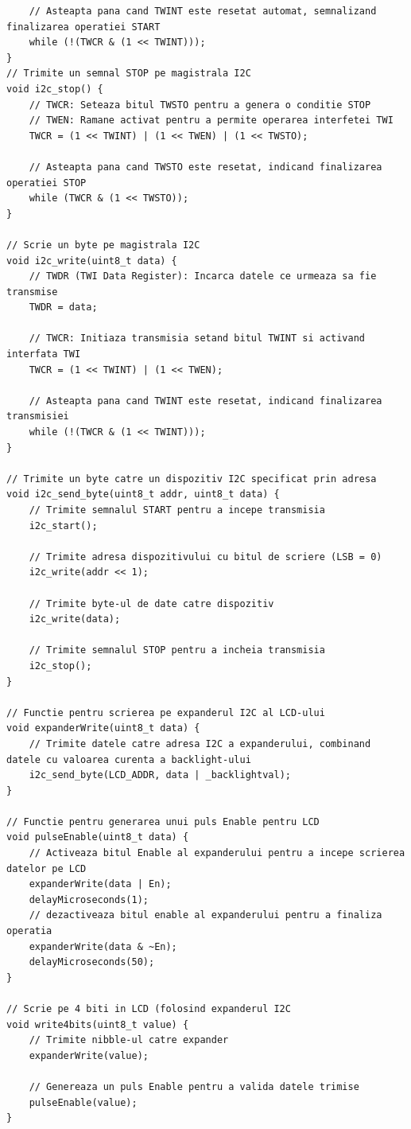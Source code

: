 \documentclass[a4paper,12pt]{report}
\begin{document}
\begin{lstlisting}
    // Asteapta pana cand TWINT este resetat automat, semnalizand finalizarea operatiei START
    while (!(TWCR & (1 << TWINT)));
}
// Trimite un semnal STOP pe magistrala I2C
void i2c_stop() {
    // TWCR: Seteaza bitul TWSTO pentru a genera o conditie STOP
    // TWEN: Ramane activat pentru a permite operarea interfetei TWI
    TWCR = (1 << TWINT) | (1 << TWEN) | (1 << TWSTO);

    // Asteapta pana cand TWSTO este resetat, indicand finalizarea operatiei STOP
    while (TWCR & (1 << TWSTO));
}

// Scrie un byte pe magistrala I2C
void i2c_write(uint8_t data) {
    // TWDR (TWI Data Register): Incarca datele ce urmeaza sa fie transmise
    TWDR = data;

    // TWCR: Initiaza transmisia setand bitul TWINT si activand interfata TWI
    TWCR = (1 << TWINT) | (1 << TWEN);

    // Asteapta pana cand TWINT este resetat, indicand finalizarea transmisiei
    while (!(TWCR & (1 << TWINT)));
}

// Trimite un byte catre un dispozitiv I2C specificat prin adresa
void i2c_send_byte(uint8_t addr, uint8_t data) {
    // Trimite semnalul START pentru a incepe transmisia
    i2c_start();

    // Trimite adresa dispozitivului cu bitul de scriere (LSB = 0)
    i2c_write(addr << 1);

    // Trimite byte-ul de date catre dispozitiv
    i2c_write(data);

    // Trimite semnalul STOP pentru a incheia transmisia
    i2c_stop();
}

// Functie pentru scrierea pe expanderul I2C al LCD-ului
void expanderWrite(uint8_t data) {
    // Trimite datele catre adresa I2C a expanderului, combinand datele cu valoarea curenta a backlight-ului
    i2c_send_byte(LCD_ADDR, data | _backlightval);
}

// Functie pentru generarea unui puls Enable pentru LCD
void pulseEnable(uint8_t data) {
    // Activeaza bitul Enable al expanderului pentru a incepe scrierea datelor pe LCD
    expanderWrite(data | En);
    delayMicroseconds(1);
    // dezactiveaza bitul enable al expanderului pentru a finaliza operatia
    expanderWrite(data & ~En);
    delayMicroseconds(50);
}

// Scrie pe 4 biti in LCD (folosind expanderul I2C
void write4bits(uint8_t value) {
    // Trimite nibble-ul catre expander
    expanderWrite(value);

    // Genereaza un puls Enable pentru a valida datele trimise
    pulseEnable(value);
}


\end{lstlisting}
\end{document}
